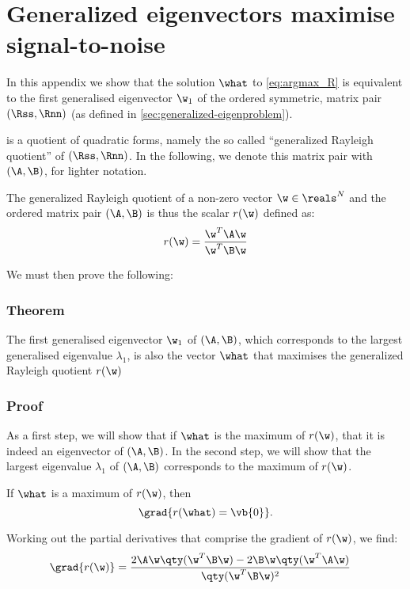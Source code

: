 \chapter{Generalized eigenvectors maximise signal-to-noise}
\label{apx:GEvecs-maximise-SNR}

In this appendix we show that the solution $\what$ to \cref{eq:argmax_R} is equivalent to the first generalised eigenvector $\w_1$ of the ordered symmetric, matrix pair $(\Rss, \Rnn)$ (as defined in \cref{sec:generalized-eigenproblem}).

 is a quotient of quadratic forms, namely the so called ``generalized Rayleigh quotient'' of $(\Rss, \Rnn)$. In the following, we denote this matrix pair with $(\A,\B)$, for lighter notation.

The generalized Rayleigh quotient of a non-zero vector $\w \in \reals^N$ and the ordered matrix pair $(\A,\B)$ is thus the scalar $r(\w)$ defined as:
%
\begin{equation}
\label{eq:Rayleigh}
r(\w) = \frac{\w^T \A \w}
             {\w^T \B \w}
\end{equation}

We must then prove the following:



\subsection{Theorem}

The first generalised eigenvector $\w_1$ of $(\A,\B)$, which corresponds to the largest generalised eigenvalue $\lambda_1$, is also the vector $\what$ that maximises the generalized Rayleigh quotient $r(\w)$




\subsection{Proof}

As a first step, we will show that if $\what$ is the maximum of $r(\w)$, that it is indeed an eigenvector of $(\A,\B)$. In the second step, we will show that the largest eigenvalue $\lambda_1$ of $(\A,\B)$ corresponds to the maximum of $r(\w)$.

If $\what$ is a maximum of $r(\w)$, then
\begin{equation}
\label{eq:critical}
\grad{r(\what) = \vb{0}}.
\end{equation}

Working out the partial derivatives that comprise the gradient of $r(\w)$, we find:
\begin{align*}
\grad{r(\w)} &= \frac{2 \A \w \qty(\w^T \B \w) 
                      - 2 \B \w \qty(\w^T \A \w)}
                     {\qty(\w^T \B \w)^2}
\end{align*}

